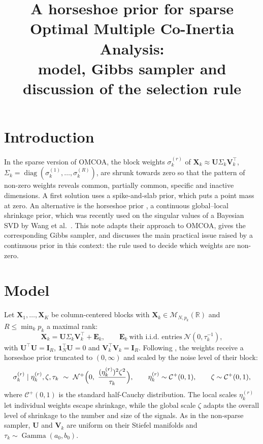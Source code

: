 \documentclass[11pt]{article}
\title{A horseshoe prior for sparse Optimal Multiple Co-Inertia Analysis:\\
model, Gibbs sampler and discussion of the selection rule}
\date{}
\DeclareMathOperator{\diag}{diag}
\DeclareMathOperator{\Ga}{Gamma}
\newcommand{\X}{\mathbf{X}}
\newcommand{\U}{\mathbf{U}}
\newcommand{\V}{\mathbf{V}}
\newcommand{\EE}{\mathbf{E}}
\newcommand{\I}{\mathbf{I}}
\newcommand{\one}{\mathbf{1}}
\begin{document}
\maketitle

\section{Introduction}

In the sparse version of OMCOA, the block weights $\sigma_k^{(r)}$ of
$\X_k\approx\U\Sigma_k\V_k^\intercal$, $\Sigma_k=\diag(\sigma_k^{(1)},\ldots,\sigma_k^{(R)})$, are shrunk towards zero so
that the pattern of non-zero weights reveals common, partially common, specific and inactive dimensions. A first
solution uses a spike-and-slab prior, which puts a point mass at zero. An alternative is the horseshoe prior
\cite{carvalho2010}, a continuous global--local shrinkage prior, which was recently used on the singular values of a
Bayesian SVD by Wang et al.\ \cite{wang2025}. This note adapts their approach to OMCOA, gives the corresponding Gibbs
sampler, and discusses the main practical issue raised by a continuous prior in this context: the rule used to
decide which weights are non-zero.

\section{Model}

Let $\X_1,\ldots,\X_K$ be column-centered blocks with $\X_k\in\mathcal M_{N,p_k}(\mathbb R)$ and $R\leq\min_kp_k$ a maximal rank:
\begin{equation}
  \X_k=\U\Sigma_k\V_k^\intercal+\EE_k,\qquad \EE_k\ \text{with i.i.d.\ entries}\ \mathcal N(0,\tau_k^{-1}),
  \label{eq:model}
\end{equation}
with $\U^\intercal\U=\I_R$, $\one_N^\intercal\U=0$ and $\V_k^\intercal\V_k=\I_R$. Following \cite{wang2025}, the weights receive a
horseshoe prior truncated to $(0,\infty)$ and scaled by the noise level of their block:
\begin{equation}
  \sigma_k^{(r)}\mid\eta_k^{(r)},\zeta,\tau_k\ \sim\ \mathcal N^+\Bigl(0,\ \frac{(\eta_k^{(r)})^2\zeta^2}{\tau_k}\Bigr),\qquad
  \eta_k^{(r)}\sim\mathcal C^+(0,1),\qquad \zeta\sim\mathcal C^+(0,1),
  \label{eq:hs}
\end{equation}
where $\mathcal C^+(0,1)$ is the standard half-Cauchy distribution. The local scales $\eta_k^{(r)}$ let individual
weights escape shrinkage, while the global scale $\zeta$ adapts the overall level of shrinkage to the number and
size of the signals. As in the non-sparse sampler, $\U$ and $\V_k$ are uniform on their Stiefel manifolds and
$\tau_k\sim\Ga(a_0,b_0)$.
\end{document}
